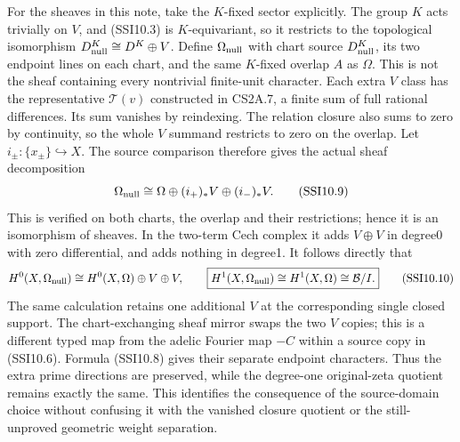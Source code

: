 For the sheaves in this note, take the \(K\)-fixed sector explicitly.
The group \(K\) acts trivially on \(V\), and (SSI10.3) is
\(K\)-equivariant, so it restricts to the topological isomorphism
\(D_{\rm null}^K\cong D^K\oplus V\). Define \(\Omega_{\rm null}\) with
chart source \(D_{\rm null}^K\), its two endpoint lines on each chart,
and the same \(K\)-fixed overlap \(A\) as \(\Omega\). This is not the
sheaf containing every nontrivial finite-unit character. Each extra
\(V\) class has the representative \(\mathscr T(v)\) constructed in
CS2A.7, a finite sum of full rational differences. Its sum vanishes by
reindexing. The relation closure also sums to zero by continuity, so the
whole \(V\) summand restricts to zero on the overlap. Let
\(i_\pm:\{x_\pm\}\hookrightarrow X\). The source comparison therefore
gives the actual sheaf decomposition \[
\Omega_{\rm null}\cong\Omega\oplus(i_+)_*V\oplus(i_-)_*V.
\tag{SSI10.9}
\] This is verified on both charts, the overlap and their restrictions;
hence it is an isomorphism of sheaves. In the two-term Cech complex it
adds \(V\oplus V\) in degree0 with zero differential, and adds nothing
in degree1. It follows directly that \[
H^0(X,\Omega_{\rm null})\cong H^0(X,\Omega)\oplus V\oplus V,
\qquad
\boxed{H^1(X,\Omega_{\rm null})\cong H^1(X,\Omega)
\cong\mathcal B/I.}
\tag{SSI10.10}
\] The same calculation retains one additional \(V\) at the
corresponding single closed support. The chart-exchanging sheaf mirror
swaps the two \(V\) copies; this is a different typed map from the
adelic Fourier map \(-C\) within a source copy in (SSI10.6). Formula
(SSI10.8) gives their separate endpoint characters. Thus the extra prime
directions are preserved, while the degree-one original-zeta quotient
remains exactly the same. This identifies the consequence of the
source-domain choice without confusing it with the vanished closure
quotient or the still-unproved geometric weight separation.
